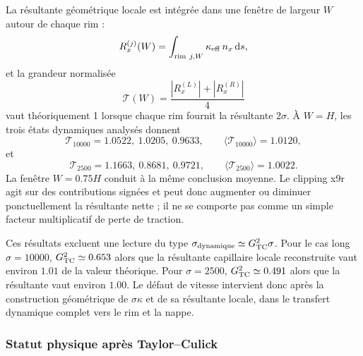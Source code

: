 \documentclass[11pt,a4paper]{article}
\begin{document}
La résultante géométrique locale est intégrée dans une fenêtre de largeur $W$ autour de chaque rim :
\begin{equation}
  R_{x}^{(j)}(W)
  =\int_{\mathrm{rim}\ j,W}
   \kappa_{\rm eff}\,n_x\,\mathrm ds,
\end{equation}
et la grandeur normalisée
\begin{equation}
  \mathcal T(W)
  =\frac{|R_x^{(L)}|+|R_x^{(R)}|}{4}
  \label{eq:x13n_rim_traction_norm}
\end{equation}
vaut théoriquement 1 lorsque chaque rim fournit la résultante $2\sigma$. À $W=H$, les trois états dynamiques analysés donnent
\begin{equation}
  \mathcal T_{10000}
  =1.0522,\ 1.0205,\ 0.9633,
  \qquad
  \langle\mathcal T_{10000}\rangle=1.0120,
\end{equation}
et
\begin{equation}
  \mathcal T_{2500}
  =1.1663,\ 0.8681,\ 0.9721,
  \qquad
  \langle\mathcal T_{2500}\rangle=1.0022.
\end{equation}
La fenêtre $W=0.75H$ conduit à la même conclusion moyenne. Le clipping x9r agit sur des contributions signées et peut donc augmenter ou diminuer ponctuellement la résultante nette ; il ne se comporte pas comme un simple facteur multiplicatif de perte de traction.

Ces résultats excluent une lecture du type $\sigma_{\rm dynamique}\simeq G_{\rm TC}^2\sigma$. Pour le cas long $\sigma=10000$, $G_{\rm TC}^2\simeq0.653$ alors que la résultante capillaire locale reconstruite vaut environ $1.01$ de la valeur théorique. Pour $\sigma=2500$, $G_{\rm TC}^2\simeq0.491$ alors que la résultante vaut environ $1.00$. Le défaut de vitesse intervient donc après la construction géométrique de $\sigma\kappa$ et de sa résultante locale, dans le transfert dynamique complet vers le rim et la nappe.

\subsubsection{Statut physique après Taylor--Culick}
\end{document}

